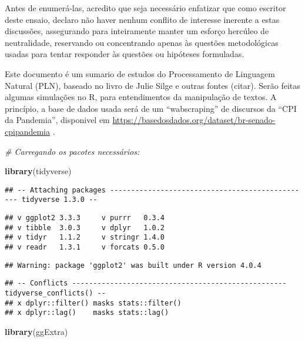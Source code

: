 \documentclass[
]{article}
\newenvironment{Shaded}{\begin{snugshade}}{\end{snugshade}}
\newcommand{\CommentTok}[1]{\textcolor[rgb]{0.56,0.35,0.01}{\textit{#1}}}
\newcommand{\KeywordTok}[1]{\textcolor[rgb]{0.13,0.29,0.53}{\textbf{#1}}}
\newcommand{\NormalTok}[1]{#1}
\begin{document}
Antes de enumerá-las, acredito que seja necessário enfatizar que como
escritor deste ensaio, declaro não haver nenhum conflito de interesse
inerente a estas discussões, assegurando para inteiramente manter um
esforço hercúleo de neutralidade, reservando ou concentrando apenas às
questões metodológicas usadas para tentar responder às questões ou
hipóteses formuladas.

Este documento é um sumario de estudos do Processamento de Linguagem
Natural (PLN), baseado no livro de Julie Silge e outras fontes (citar).
Serão feitas algumas simulações no R, para entendimentos da manipulação
de textos. A princípio, a base de dados usada será de um ``wabscraping''
de discursos da ``CPI da Pandemia'', disponivel em
\url{https://basedosdados.org/dataset/br-senado-cpipandemia} .

\begin{Shaded}
\begin{Highlighting}[]
\CommentTok{# Carregando os pacotes necessários:}

\KeywordTok{library}\NormalTok{(tidyverse)}
\end{Highlighting}
\end{Shaded}

\begin{verbatim}
## -- Attaching packages ------------------------------------------------ tidyverse 1.3.0 --
\end{verbatim}

\begin{verbatim}
## v ggplot2 3.3.3     v purrr   0.3.4
## v tibble  3.0.3     v dplyr   1.0.2
## v tidyr   1.1.2     v stringr 1.4.0
## v readr   1.3.1     v forcats 0.5.0
\end{verbatim}

\begin{verbatim}
## Warning: package 'ggplot2' was built under R version 4.0.4
\end{verbatim}

\begin{verbatim}
## -- Conflicts --------------------------------------------------- tidyverse_conflicts() --
## x dplyr::filter() masks stats::filter()
## x dplyr::lag()    masks stats::lag()
\end{verbatim}

\begin{Shaded}
\begin{Highlighting}[]
\KeywordTok{library}\NormalTok{(ggExtra)}
\end{Highlighting}
\end{Shaded}
\end{document}
